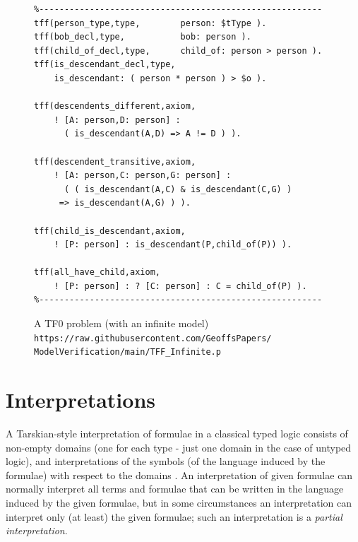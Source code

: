 \documentclass[letterpaper]{article}
\begin{document}
\begin{figure}[htbp]
\scriptsize
{}
\begin{verbatim}
%--------------------------------------------------------
tff(person_type,type,        person: $tType ).
tff(bob_decl,type,           bob: person ).
tff(child_of_decl,type,      child_of: person > person ).
tff(is_descendant_decl,type, 
    is_descendant: ( person * person ) > $o ).

tff(descendents_different,axiom,
    ! [A: person,D: person] : 
      ( is_descendant(A,D) => A != D ) ).

tff(descendent_transitive,axiom,
    ! [A: person,C: person,G: person] :
      ( ( is_descendant(A,C) & is_descendant(C,G) ) 
     => is_descendant(A,G) ) ).

tff(child_is_descendant,axiom,
    ! [P: person] : is_descendant(P,child_of(P)) ).

tff(all_have_child,axiom,
    ! [P: person] : ? [C: person] : C = child_of(P) ).
%--------------------------------------------------------
\end{verbatim}
\caption{A TF0 problem (with an infinite model)\\
{\scriptsize {\tt https://raw.githubusercontent.com/GeoffsPapers/\\
ModelVerification/main/TFF\_Infinite.p}}}
\label{TF0InfiniteProblem}
\end{figure}


\section{Interpretations}
\label{Interpretations}

A Tarskian-style \cite{TV56} interpretation of formulae in a classical typed logic consists of 
non-empty domains (one for each type - just one domain in the case of untyped logic), and 
interpretations of the symbols (of the language induced by the formulae) with respect to the domains 
\cite{Hun96}.
An interpretation of given formulae can normally interpret all terms and formulae that can be 
written in the language induced by the given formulae, but in some circumstances an interpretation 
can interpret only (at least) the given formulae; such an interpretation is a {\em partial
interpretation}.
\end{document}

